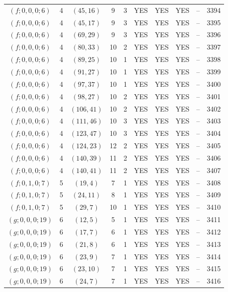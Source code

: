 \begin{longtable}{|c|c|c|c|c|c|c|c|c|c|}
$(f; 0, 0, 0; 6)$ & 4 & $(45, 16)$ & 9 & 3 & YES & YES & YES & -- & 3394\\
$(f; 0, 0, 0; 6)$ & 4 & $(45, 17)$ & 9 & 3 & YES & YES & YES & -- & 3395\\
$(f; 0, 0, 0; 6)$ & 4 & $(69, 29)$ & 9 & 3 & YES & YES & YES & -- & 3396\\
$(f; 0, 0, 0; 6)$ & 4 & $(80, 33)$ & 10 & 2 & YES & YES & YES & -- & 3397\\
$(f; 0, 0, 0; 6)$ & 4 & $(89, 25)$ & 10 & 1 & YES & YES & YES & -- & 3398\\
$(f; 0, 0, 0; 6)$ & 4 & $(91, 27)$ & 10 & 1 & YES & YES & YES & -- & 3399\\
$(f; 0, 0, 0; 6)$ & 4 & $(97, 37)$ & 10 & 1 & YES & YES & YES & -- & 3400\\
$(f; 0, 0, 0; 6)$ & 4 & $(98, 27)$ & 10 & 2 & YES & YES & YES & -- & 3401\\
$(f; 0, 0, 0; 6)$ & 4 & $(106, 41)$ & 10 & 2 & YES & YES & YES & -- & 3402\\
$(f; 0, 0, 0; 6)$ & 4 & $(111, 46)$ & 10 & 3 & YES & YES & YES & -- & 3403\\
$(f; 0, 0, 0; 6)$ & 4 & $(123, 47)$ & 10 & 3 & YES & YES & YES & -- & 3404\\
$(f; 0, 0, 0; 6)$ & 4 & $(124, 23)$ & 12 & 2 & YES & YES & YES & -- & 3405\\
$(f; 0, 0, 0; 6)$ & 4 & $(140, 39)$ & 11 & 2 & YES & YES & YES & -- & 3406\\
$(f; 0, 0, 0; 6)$ & 4 & $(140, 41)$ & 11 & 2 & YES & YES & YES & -- & 3407\\
$(f; 0, 1, 0; 7)$ & 5 & $(19, 4)$ & 7 & 1 & YES & YES & YES & -- & 3408\\
$(f; 0, 1, 0; 7)$ & 5 & $(24, 11)$ & 8 & 1 & YES & YES & YES & -- & 3409\\
$(f; 0, 1, 0; 7)$ & 5 & $(29, 7)$ & 10 & 1 & YES & YES & YES & -- & 3410\\
$(g; 0, 0, 0; 19)$ & 6 & $(12, 5)$ & 5 & 1 & YES & YES & YES & -- & 3411\\
$(g; 0, 0, 0; 19)$ & 6 & $(17, 7)$ & 6 & 1 & YES & YES & YES & -- & 3412\\
$(g; 0, 0, 0; 19)$ & 6 & $(21, 8)$ & 6 & 1 & YES & YES & YES & -- & 3413\\
$(g; 0, 0, 0; 19)$ & 6 & $(23, 9)$ & 7 & 1 & YES & YES & YES & -- & 3414\\
$(g; 0, 0, 0; 19)$ & 6 & $(23, 10)$ & 7 & 1 & YES & YES & YES & -- & 3415\\
$(g; 0, 0, 0; 19)$ & 6 & $(24, 7)$ & 7 & 1 & YES & YES & YES & -- & 3416\\

\end{longtable}
